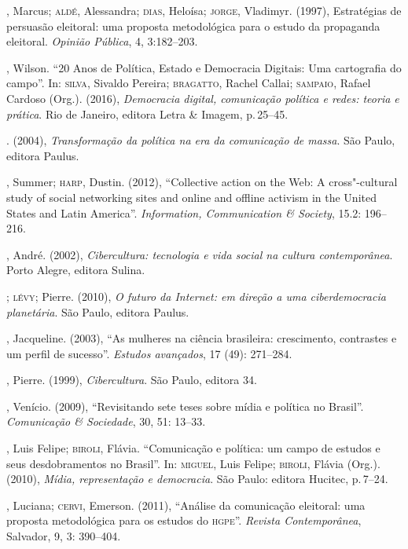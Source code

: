 \begin{bibliohedra}
, Marcus; \textsc{aldé}, Alessandra; \textsc{dias}, Heloísa; \textsc{jorge}, Vladimyr.
(1997), Estratégias de persuasão eleitoral: uma proposta metodológica
para o estudo da propaganda eleitoral. \textit{Opinião Pública}, 4,
3:182--203.

, Wilson. ``20 Anos de Política, Estado e Democracia Digitais: Uma
cartografia do campo''. In: \textsc{silva}, Sivaldo Pereira; \textsc{bragatto}, Rachel
Callai; \textsc{sampaio}, Rafael Cardoso (Org.). (2016), \textit{Democracia
digital, comunicação política e redes: teoria e prática}. Rio
de Janeiro, editora Letra \& Imagem, p.\,25--45.

\titidem. (2004), \textit{Transformação da política na era da
comunicação de massa}. São Paulo, editora Paulus.

, Summer; \textsc{harp}, Dustin. (2012), ``Collective action on the Web: A
cross"-cultural study of social networking sites and online and offline
activism in the United States and Latin America''. \textit{Information,
Communication \& Society}, 15.2: 196--216.

, André. (2002), \textit{Cibercultura: tecnologia e vida social na
cultura contemporânea}. Porto Alegre, editora Sulina.

\titidem; \textsc{lévy}; Pierre. (2010), \textit{O futuro da Internet: em
direção a uma ciberdemocracia planetária}. São Paulo, editora Paulus.

, Jacqueline. (2003), ``As mulheres na ciência brasileira:
crescimento, contrastes e um perfil de sucesso''. \textit{Estudos
avançados}, 17 (49): 271--284.

, Pierre. (1999), \textit{Cibercultura}. São Paulo, editora 34.

, Venício. (2009), ``Revisitando sete teses sobre mídia e política
no Brasil''. \textit{Comunicação \& Sociedade}, 30, 51: 13--33.

, Luis Felipe; \textsc{biroli}, Flávia. ``Comunicação e política: um campo
de estudos e seus desdobramentos no Brasil''. In: \textsc{miguel}, Luis Felipe;
\textsc{biroli}, Flávia (Org.). (2010), \textit{Mídia, representação e democracia}.
São Paulo: editora Hucitec, p.\,7--24.

, Luciana; \textsc{cervi}, Emerson. (2011), ``Análise da comunicação
eleitoral: uma proposta metodológica para os estudos do \textsc{hgpe}''.
\textit{Revista Contemporânea}, Salvador, 9, 3: 390--404.


\end{bibliohedra}
